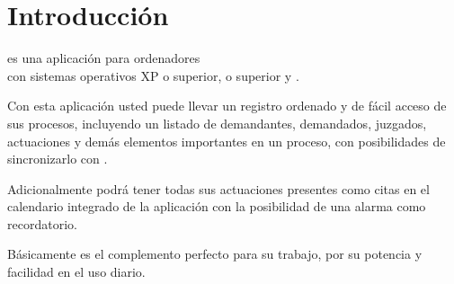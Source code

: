 \chapter{Introducci\'on}
\label{sec:intro}
\softwareAbogadosDesktop es una aplicaci\'on para ordenadores \\con
sistemas operativos \microsoft \windows XP o superior,  o superior y \linux. 

Con esta aplicaci\'on usted puede llevar un registro ordenado y de f\'acil acceso de sus procesos, incluyendo un listado de demandantes, demandados, juzgados, actuaciones y dem\'as elementos importantes
en un proceso, con posibilidades de sincronizarlo con \softwareAbogadosMobile.

Adicionalmente podr\'a tener todas sus actuaciones presentes como citas en el
calendario integrado de la aplicaci\'on con la posibilidad de una alarma como
recordatorio.

B\'asicamente \softwareAbogadosDesktop es el complemento perfecto para su
trabajo, por su potencia y facilidad en el uso diario.
